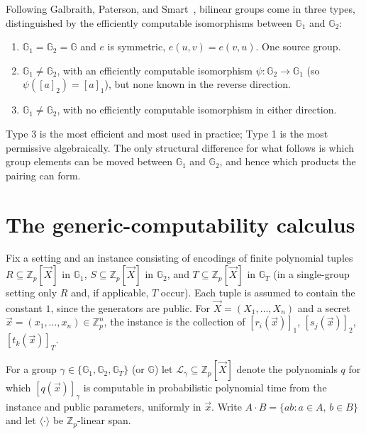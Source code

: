 \documentclass{conjura-solution}
\newcommand{\G}{\mathbb{G}}
\newcommand{\Gone}{\mathbb{G}_1}
\newcommand{\Gtwo}{\mathbb{G}_2}
\newcommand{\GT}{\mathbb{G}_T}
\newcommand{\Zp}{\mathbb{Z}_p}
\newcommand{\vx}{\vec{x}}
\newcommand{\vX}{\vec{X}}
\newcommand{\LL}{\mathcal{L}}
\newcommand{\Span}[1]{\langle #1 \rangle} %
\begin{document}
Following Galbraith, Paterson, and Smart~\cite{GPS08}, bilinear groups come in three types,
distinguished by the efficiently computable isomorphisms between $\Gone$ and $\Gtwo$:
\begin{enumerate}[label=\textup{Type~\arabic*.},leftmargin=4.4em,itemsep=3pt]
  \item $\Gone=\Gtwo=\G$ and $e$ is symmetric, $e(u,v)=e(v,u)$. One source group.
  \item $\Gone\neq\Gtwo$, with an efficiently computable isomorphism
        $\psi\colon\Gtwo\to\Gone$ (so $\psi([a]_2)=[a]_1$), but none known in the reverse
        direction.
  \item $\Gone\neq\Gtwo$, with no efficiently computable isomorphism in either direction.
\end{enumerate}
Type 3 is the most efficient and most used in practice; Type 1 is the most permissive
algebraically. The only structural difference for what follows is which group elements can
be moved between $\Gone$ and $\Gtwo$, and hence which products the pairing can form.

\section{The generic-computability calculus}

Fix a setting and an instance consisting of encodings of finite polynomial tuples
$R\subseteq\Zp[\vX]$ in $\Gone$, $S\subseteq\Zp[\vX]$ in $\Gtwo$, and $T\subseteq\Zp[\vX]$
in $\GT$ (in a single-group setting only $R$ and, if applicable, $T$ occur). Each tuple is
assumed to contain the constant $1$, since the generators are public. For $\vX=(X_1,\dots,X_n)$
and a secret $\vx=(x_1,\dots,x_n)\in\Zp^{n}$, the instance is the collection of $[r_i(\vx)]_1$,
$[s_j(\vx)]_2$, $[t_k(\vx)]_T$.

For a group $\gamma\in\{\Gone,\Gtwo,\GT\}$ (or $\G$) let $\LL_\gamma\subseteq\Zp[\vX]$
denote the polynomials $q$ for which $[q(\vx)]_\gamma$ is computable in probabilistic
polynomial time from the instance and public parameters, uniformly in $\vx$. Write
$A\cdot B=\{ab:a\in A,\,b\in B\}$ and let $\Span{\cdot}$ be $\Zp$-linear span.
\end{document}
